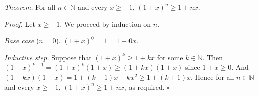 \textit{Theorem.} For all $n \in \mathbb{N}$ and every $x \geq -1$, $(1 + x)^{n} \geq 1 + nx$.

\textit{Proof.} Let $x \geq -1$.
We proceed by induction on $n$.

\textit{Base case} ($n = 0$). $(1 + x)^{0} = 1 = 1 + 0x$.

\textit{Inductive step.} Suppose that $(1 + x)^{k} \geq 1 + kx$ for some $k \in \mathbb{N}$.
Then $(1 + x)^{k + 1} = (1 + x)^{k}(1 + x) \geq (1 + kx)(1 + x)$ since $1 + x \geq 0$.
And $(1 + kx)(1 + x) = 1 + (k + 1)x + kx^{2} \geq 1 + (k + 1)x$.
Hence for all $n \in \mathbb{N}$ and every $x \geq -1$, $(1 + x)^{n} \geq 1 + nx$, as required. \hfill$\square$